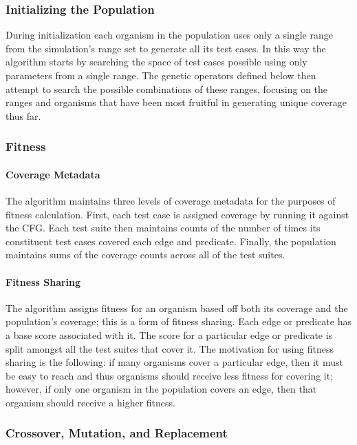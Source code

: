 \documentclass[runningheads]{llncs}
\begin{document}
\subsubsection{Initializing the Population}

During initialization each organism in the population uses only a single range from the simulation's range set to generate all its test cases. In this way the algorithm starts by searching the space of test cases possible using only parameters from a single range. The genetic operators defined below then attempt to search the possible combinations of these ranges, focusing on the ranges and organisms that have been most fruitful in generating unique coverage thus far.

\subsubsection{Fitness}

\paragraph{Coverage Metadata}
The algorithm maintains three levels of coverage metadata for the purposes of fitness calculation. First, each test case is assigned coverage by running it against the CFG. Each test suite then maintains counts of the number of times its constituent test cases covered each edge and predicate. Finally, the population maintains sums of the coverage counts across all of the test suites.

\paragraph{Fitness Sharing}
The algorithm assigns fitness for an organism based off both its coverage and the population's coverage; this is a form of fitness sharing. Each edge or predicate has a base score associated with it. The score for a particular edge or predicate is split amongst all the test suites that cover it. The motivation for using fitness sharing is the following: if many organisms cover a particular edge, then it must be easy to reach and thus organisms should receive less fitness for covering it; however, if only one organism in the population covers an edge, then that organism should receive a higher fitness. 

\subsubsection{Crossover, Mutation, and Replacement}
\end{document}
